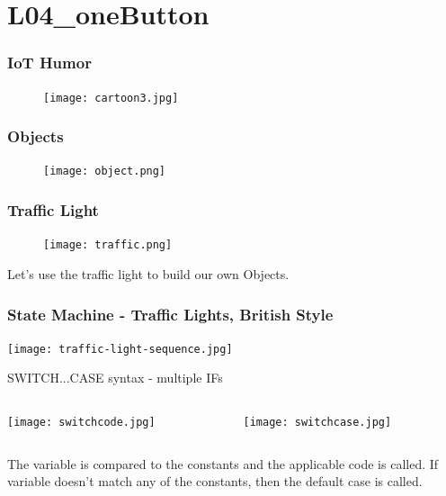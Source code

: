 \documentclass{beamer}
\begin{document}
\section{L04\_oneButton}

\begin{frame}\frametitle{IoT Humor}
\begin{figure}[h]
	\texttt{[image: cartoon3.jpg]}
\end{figure}
\end{frame}

\begin{frame}\frametitle{Objects}
\begin{figure}[h]
	\texttt{[image: object.png]}
\end{figure}
\end{frame}

\begin{frame}\frametitle{Traffic Light}
\begin{figure}[h]
	\texttt{[image: traffic.png]}
\end{figure}
Let's use the traffic light to build our own Objects.
\end{frame}

\begin{frame}\frametitle{State Machine - Traffic Lights, British Style}

\texttt{[image: traffic-light-sequence.jpg]}

\end{frame}


\begin{frame}{SWITCH...CASE syntax - multiple IFs}

\begin{columns}
\begin{column}{5cm}
\texttt{[image: switchcode.jpg]}
\end{column}
\begin{column}{5cm}
\texttt{[image: switchcase.jpg]}
\end{column}
\end{columns}

\vspace{0.25cm}

The variable is compared to the constants and the applicable code is called. If variable doesn't match any of the constants, then the default case is called. 
\end{frame}
\end{document}
